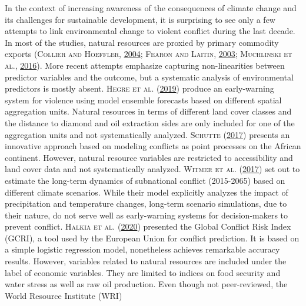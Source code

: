 \documentclass[a4paper,11pt]{article}
\begin{document}
In the context of increasing awareness of the consequences of climate change and
its challenges for sustainable development, it is surprising to see
only a few attempts to link environmental change to violent conflict during the
last decade. In most of the studies, natural resources are proxied by primary commodity exports
\textsc{(\textnormal{\textsc{Collier} and \textsc{Hoeffler}}, \textnormal{\protect\hyperlink{ref-collier2004}{2004}}; \textnormal{\textsc{Fearon} and \textsc{Laitin}}, \textnormal{\protect\hyperlink{ref-fearon2003}{2003}}; \textnormal{\textsc{Muchlinski} \textsc{et al.}}, \textnormal{\protect\hyperlink{ref-muchlinski2016}{2016}})}. More recent attempts emphasize
capturing non-linearities between predictor variables and the outcome,
but a systematic analysis of environmental predictors is mostly absent. \textsc{\textnormal{Hegre} \textnormal{et al.}} \textsc{(\textnormal{\protect\hyperlink{ref-hegre2019}{2019}})} produce an
early-warning system for violence using model ensemble forecasts based on different
spatial aggregation units. Natural resources in terms of different land cover
classes and the distance to diamond and oil extraction sides are only
included for one of the aggregation units and not systematically analyzed.
\textsc{\textnormal{Schutte}} \textsc{(\textnormal{\protect\hyperlink{ref-schutte2017}{2017}})} presents an innovative approach based on modeling conflicts
as point processes on the African continent. However, natural resource variables
are restricted to accessibility and land cover data and not systematically analyzed.
\textsc{\textnormal{Witmer} \textnormal{et al.}} \textsc{(\textnormal{\protect\hyperlink{ref-witmer2017}{2017}})} set out to estimate the long-term dynamics of subnational conflict (2015-2065)
based on different climate scenarios. While their model explicitly analyzes the
impact of precipitation and temperature changes, long-term scenario simulations,
due to their nature, do not serve well as early-warning systems for decision-makers
to prevent conflict. \textsc{\textnormal{Halkia} \textnormal{et al.}} \textsc{(\textnormal{\protect\hyperlink{ref-halkia2020a}{2020}})} presented the
Global Conflict Risk Index (GCRI), a tool used by the European Union for conflict
prediction. It is based on a simple logistic regression model, nonetheless
achieves remarkable accuracy results. However, variables related to natural
resources are included under the label of economic variables. They are limited
to indices on food security and water stress as well as raw oil production.
Even though not peer-reviewed, the World Resource Institute (WRI)
\end{document}
